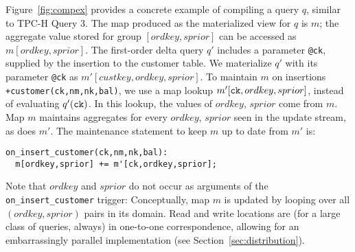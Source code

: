 Figure~\ref{fig:compex} provides a concrete example of compiling a query $q$,
similar to TPC-H Query 3. 
The map produced as the materialized view for $q$ is $m$; the
aggregate value stored for group $[ordkey,sprior]$ can be accessed as
$m[ordkey,sprior]$.
The first-order delta query $q'$ includes a
parameter {\tt @ck}, supplied by the insertion to the customer table.
We materialize $q'$ with its parameter {\tt @ck} as $m'[custkey,ordkey,sprior]$.
To maintain $m$ on insertions {\tt +customer(ck,nm,nk,bal)}, we use
a map lookup $m'[\mbox{{\tt ck}},ordkey,sprior]$, instead of evaluating
$q'(\mbox{{\tt ck}})$. In this lookup, the values of $ordkey$, $sprior$ come
from $m$. Map $m$ maintains aggregates for every $ordkey$, $sprior$ seen in the
update stream, as does $m'$. The maintenance statement to keep $m$ up to date
from $m'$ is:


{\footnotesize
\begin{verbatim}
on_insert_customer(ck,nm,nk,bal):
  m[ordkey,sprior] += m'[ck,ordkey,sprior];
\end{verbatim}
}

\noindent
Note that $ordkey$ and $sprior$ do not occur as arguments of the {\tt
on\_insert\_customer} trigger: Conceptually, map $m$ is updated by looping over
all $(ordkey, sprior)$ pairs in its domain. Read and write locations are (for a
large class of queries, always) in one-to-one correspondence, allowing for an
embarrassingly parallel implementation (see Section~\ref{sec:distribution}).

